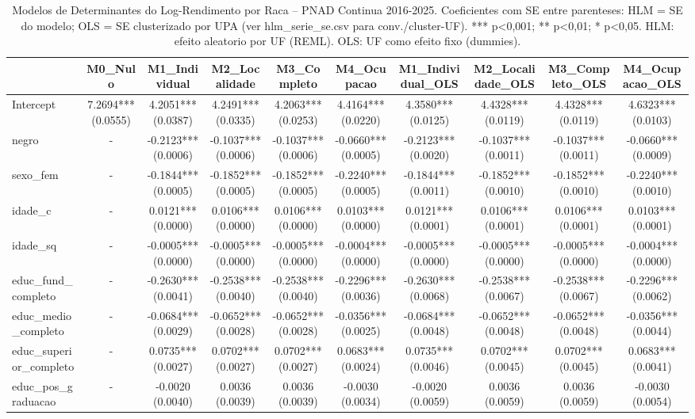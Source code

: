\begin{table}
\caption{Modelos de Determinantes do Log-Rendimento por Raca -- PNAD Continua 2016-2025. Coeficientes com SE entre parenteses: HLM = SE do modelo; OLS = SE clusterizado por UPA (ver hlm_serie_se.csv para conv./cluster-UF). *** p<0,001; ** p<0,01; * p<0,05. HLM: efeito aleatorio por UF (REML). OLS: UF como efeito fixo (dummies).}
\label{tab:hlm_serie_completa}
\begin{tabular}{lccccccccc}
\toprule
 & M0_Nulo & M1_Individual & M2_Localidade & M3_Completo & M4_Ocupacao & M1_Individual_OLS & M2_Localidade_OLS & M3_Completo_OLS & M4_Ocupacao_OLS \\
\midrule
Intercept & 7.2694*** (0.0555) & 4.2051*** (0.0387) & 4.2491*** (0.0335) & 4.2063*** (0.0253) & 4.4164*** (0.0220) & 4.3580*** (0.0125) & 4.4328*** (0.0119) & 4.4328*** (0.0119) & 4.6323*** (0.0103) \\
negro & - & -0.2123*** (0.0006) & -0.1037*** (0.0006) & -0.1037*** (0.0006) & -0.0660*** (0.0005) & -0.2123*** (0.0020) & -0.1037*** (0.0011) & -0.1037*** (0.0011) & -0.0660*** (0.0009) \\
sexo_fem & - & -0.1844*** (0.0005) & -0.1852*** (0.0005) & -0.1852*** (0.0005) & -0.2240*** (0.0005) & -0.1844*** (0.0011) & -0.1852*** (0.0010) & -0.1852*** (0.0010) & -0.2240*** (0.0010) \\
idade_c & - & 0.0121*** (0.0000) & 0.0106*** (0.0000) & 0.0106*** (0.0000) & 0.0103*** (0.0000) & 0.0121*** (0.0001) & 0.0106*** (0.0001) & 0.0106*** (0.0001) & 0.0103*** (0.0001) \\
idade_sq & - & -0.0005*** (0.0000) & -0.0005*** (0.0000) & -0.0005*** (0.0000) & -0.0004*** (0.0000) & -0.0005*** (0.0000) & -0.0005*** (0.0000) & -0.0005*** (0.0000) & -0.0004*** (0.0000) \\
educ_fund_completo & - & -0.2630*** (0.0041) & -0.2538*** (0.0040) & -0.2538*** (0.0040) & -0.2296*** (0.0036) & -0.2630*** (0.0068) & -0.2538*** (0.0067) & -0.2538*** (0.0067) & -0.2296*** (0.0062) \\
educ_medio_completo & - & -0.0684*** (0.0029) & -0.0652*** (0.0028) & -0.0652*** (0.0028) & -0.0356*** (0.0025) & -0.0684*** (0.0048) & -0.0652*** (0.0048) & -0.0652*** (0.0048) & -0.0356*** (0.0044) \\
educ_superior_completo & - & 0.0735*** (0.0027) & 0.0702*** (0.0027) & 0.0702*** (0.0027) & 0.0683*** (0.0024) & 0.0735*** (0.0046) & 0.0702*** (0.0045) & 0.0702*** (0.0045) & 0.0683*** (0.0041) \\
educ_pos_graduacao & - & -0.0020 (0.0040) & 0.0036 (0.0039) & 0.0036 (0.0039) & -0.0030 (0.0034) & -0.0020 (0.0059) & 0.0036 (0.0059) & 0.0036 (0.0059) & -0.0030 (0.0054) \\

\end{tabular}
\end{table}
